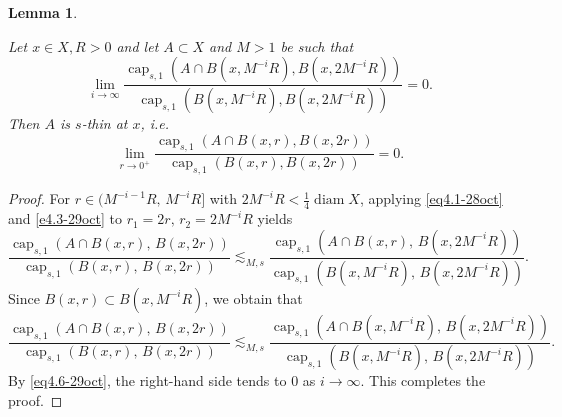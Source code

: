\documentclass[11pt,leqno]{amsart}
\newtheorem{lemma}[theorem]{Lemma}
\numberwithin{equation}{section}
\theoremstyle{definition}
\DeclareMathOperator{\capp}{cap}
\newcommand{\caps}{\capp_{s,1}}
\DeclareMathOperator{\diam}{diam}
\begin{document}
	\begin{lemma}\label{lem4.4-29oct}
		
		
		Let $x\in X, R>0$ and let $A\subset X$ and $M>1$ be such that
		\begin{equation}\label{eq4.6-29oct}
			\lim_{i\to\infty}\frac{\caps(A\cap B(x,M^{-i}R), B(x, 2M^{-i}R))}{\caps(B(x,M^{-i}R), B(x, 2M^{-i}R))}=0.
		\end{equation}
		Then $A$ is $s$-thin at $x$, i.e. 
		\[
		\lim_{r\to0^+}  \frac{\caps(A\cap B(x,r), B(x,2r))}{\caps(B(x,r),B(x,2r))} =0.
		\]
	\end{lemma}
	\begin{proof}
		For $r\in (M^{-i-1}R,\, M^{-i}R]$ with $2M^{-i}R<\frac{1}{4}\diam X$, applying \eqref{eq4.1-28oct} and \eqref{e4.3-29oct} 
		{to}
		$r_1=2r,\, r_2=2M^{-i}R$ yields
		\[
		\frac{\caps(A\cap B(x,r),\, B(x,2r))}{\caps(B(x,r),\, B(x,2r))}\lesssim_{M,s}
		\frac{\caps(A\cap B(x,r),\, B(x,2M^{-i}R))}{\caps(B(x,M^{-i}R),\, B(x,2M^{-i}R))}.
		\]
		Since $B(x,r)\subset B(x,M^{-i}R)$, we obtain that
		\[
		\frac{\caps(A\cap B(x,r),\, B(x,2r))}{\caps(B(x,r),\, B(x,2r))}\lesssim_{M,s}
		\frac{\caps(A\cap B(x,M^{-i}R),\, B(x,2M^{-i}R))}{\caps(B(x,M^{-i}R),\, B(x,2M^{-i}R))}.
		\]
		By \eqref{eq4.6-29oct}, the right-hand side tends to $0$ as $i\to\infty$. This completes the proof.
	\end{proof}
	
\end{document}
